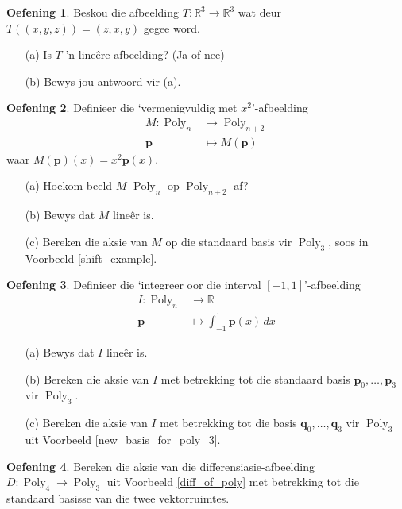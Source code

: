 \documentclass[a4paper,11pt]{book}
\theoremstyle{definition}
\newtheorem{exercise}{Oefening}
\newcommand{\ve}[1]{\mathbf{#1}}
\DeclareMathOperator{\Poly}{Poly}
\begin{document}
\begin{exercise} Beskou die afbeelding $T : \mathbb{R}^3 \rightarrow
	\mathbb{R}^3$ wat deur $T\left( (x,y,z) \right) = (z,x,y)$ gegee word.
	\begin{itemize}
		\item[(a)] Is $T$ 'n line{\^e}re afbeelding? (Ja of nee)
		\item[(b)] Bewys jou antwoord vir (a).
	\end{itemize}
\end{exercise}

\begin{exercise} Definieer die `vermenigvuldig met $x^2$'-afbeelding
	\begin{align*}
		M : \Poly_n & \rightarrow \Poly_{n+2} \\
		\ve{p} & \mapsto M(\ve{p})
	\end{align*}
	waar $M(\ve{p})(x) = x^2 \ve{p}(x)$. 
	\begin{itemize}
		\item[(a)] Hoekom beeld $M$ $\Poly_n$ op $\Poly_{n+2}$ af? 
		\item[(b)] Bewys dat $M$ line{\^e}r is.
		\item[(c)] Bereken die aksie van $M$ op die standaard basis vir
			$\Poly_3$, soos in Voorbeeld \ref{shift_example}.
	\end{itemize}
\end{exercise}

\begin{exercise} Definieer die `integreer oor die interval
	$[-1,1]$'-afbeelding
	\begin{align*}
		I : \Poly_n & \rightarrow \mathbb{R}  \\
		\ve{p} & \mapsto \int_{-1}^{1} \ve{p}(x) \, dx
	\end{align*}
	\begin{itemize}
		\item[(a)] Bewys dat $I$ line{\^e}r is.
		\item[(b)] Bereken die aksie van $I$ met betrekking tot die
			standaard basis $\ve{p}_0, \ldots, \ve{p}_3$ vir $\Poly_3$.
		\item[(c)] Bereken die aksie van $I$ met betrekking tot die basis
			$\ve{q}_0, \ldots, \ve{q}_3$ vir $\Poly_3$ uit Voorbeeld
			\ref{new_basis_for_poly_3}.
	\end{itemize}
\end{exercise}

\begin{exercise} Bereken die aksie van die differensiasie-afbeelding $D :
	\Poly_4 \rightarrow \Poly_3$ uit Voorbeeld \ref{diff_of_poly} met
	betrekking tot die standaard basisse van die twee vektorruimtes.
\end{exercise}
\end{document}
